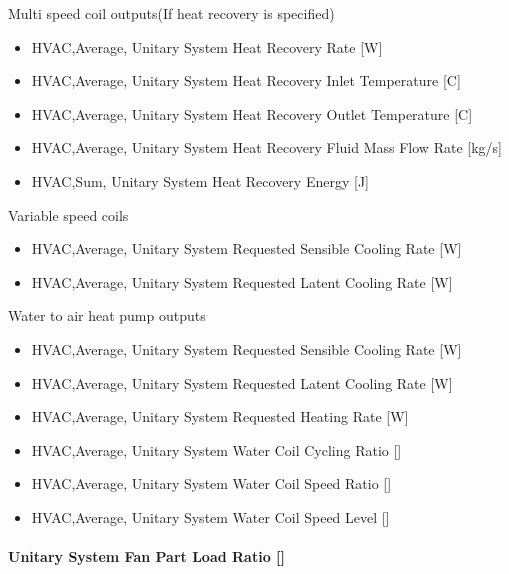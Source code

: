 Multi speed coil outputs(If heat recovery is specified)

\begin{itemize}
\item
  HVAC,Average, Unitary System Heat Recovery Rate {[}W{]}
\item
  HVAC,Average, Unitary System Heat Recovery Inlet Temperature {[}C{]}
\item
  HVAC,Average, Unitary System Heat Recovery Outlet Temperature {[}C{]}
\item
  HVAC,Average, Unitary System Heat Recovery Fluid Mass Flow Rate {[}kg/s{]}
\item
  HVAC,Sum, Unitary System Heat Recovery Energy {[}J{]}
\end{itemize}

Variable speed coils

\begin{itemize}
\item
  HVAC,Average, Unitary System Requested Sensible Cooling Rate {[}W{]}
\item
  HVAC,Average, Unitary System Requested Latent Cooling Rate {[}W{]}
\end{itemize}


Water to air heat pump outputs

\begin{itemize}
\item
  HVAC,Average, Unitary System Requested Sensible Cooling Rate {[}W{]}
\item
  HVAC,Average, Unitary System Requested Latent Cooling Rate {[}W{]}
\item
  HVAC,Average, Unitary System Requested Heating Rate {[}W{]}
\item
  HVAC,Average, Unitary System Water Coil Cycling Ratio {[]}
\item
  HVAC,Average, Unitary System Water Coil Speed Ratio {[]}
\item
  HVAC,Average, Unitary System Water Coil Speed Level {[]}
\end{itemize}

\paragraph{Unitary System Fan Part Load Ratio {[]}}\label{unitary-system-fan-part-load-ratio}

